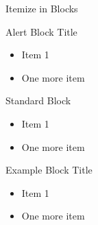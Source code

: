 \documentclass[xcolor=dvipsnames]{beamer}
\begin{document}
\begin{frame}{Itemize in Blocks}


\begin{alertblock}{Alert Block Title}
\begin{itemize}
\item Item 1
\item One more item
\end{itemize}
\end{alertblock}

\pause


\begin{block}{Standard Block}
\begin{itemize}
\item Item 1
\item One more item
\end{itemize}
\end{block}

\pause

\begin{exampleblock}{Example Block Title}
\begin{itemize}
\item Item 1
\item One more item
\end{itemize}
\end{exampleblock}


\end{frame} 
\end{document}
